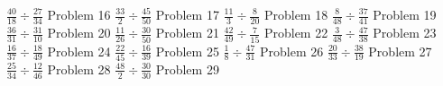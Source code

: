 \documentclass{article}
\begin{document}
\hfill \break
$\displaystyle \frac{40}{18} \div \frac{27}{34}$
\newline
\hfill \break
Problem 16
\newline
\hfill \break
$\displaystyle \frac{33}{2} \div \frac{45}{50}$
\newline
\hfill \break
Problem 17
\newline
\hfill \break
$\displaystyle \frac{11}{3} \div \frac{8}{20}$
\newline
\hfill \break
Problem 18
\newline
\hfill \break
$\displaystyle \frac{8}{48} \div \frac{37}{41}$
\newline
\hfill \break
Problem 19
\newline
\hfill \break
$\displaystyle \frac{36}{31} \div \frac{31}{10}$
\newline
\hfill \break
Problem 20
\newline
\hfill \break
$\displaystyle \frac{11}{26} \div \frac{30}{50}$
\newline
\hfill \break
Problem 21
\newline
\hfill \break
$\displaystyle \frac{42}{49} \div \frac{7}{15}$
\newline
\hfill \break
Problem 22
\newline
\hfill \break
$\displaystyle \frac{3}{48} \div \frac{47}{38}$
\newline
\hfill \break
Problem 23
\newline
\hfill \break
$\displaystyle \frac{16}{37} \div \frac{18}{49}$
\newline
\hfill \break
Problem 24
\newline
\hfill \break
$\displaystyle \frac{22}{45} \div \frac{16}{39}$
\newline
\hfill \break
Problem 25
\newline
\hfill \break
$\displaystyle \frac{1}{8} \div \frac{47}{31}$
\newline
\hfill \break
Problem 26
\newline
\hfill \break
$\displaystyle \frac{20}{33} \div \frac{38}{19}$
\newline
\hfill \break
Problem 27
\newline
\hfill \break
$\displaystyle \frac{25}{34} \div \frac{12}{46}$
\newline
\hfill \break
Problem 28
\newline
\hfill \break
$\displaystyle \frac{48}{2} \div \frac{30}{30}$
\newline
\hfill \break
Problem 29
\newline
\hfill \break
\end{document}
